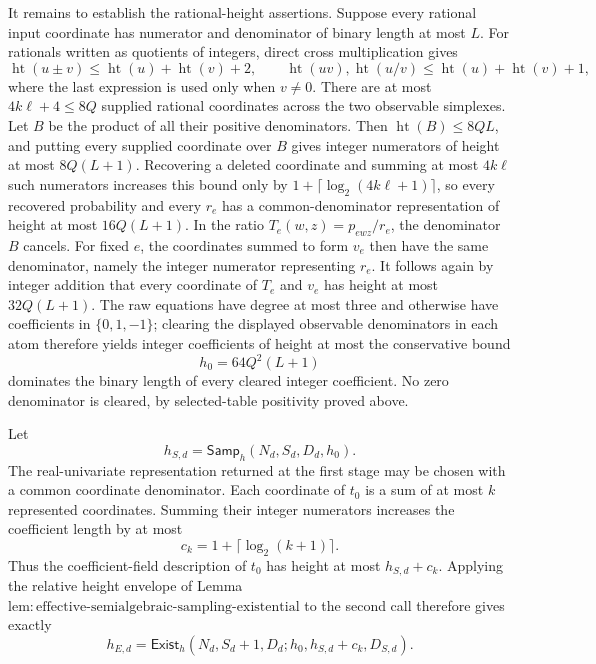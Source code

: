 It remains to establish the rational-height assertions.  Suppose every rational input coordinate has numerator and denominator of binary length at most \(L\).  For rationals written as quotients of integers, direct cross multiplication gives
\[
\operatorname{ht}(u\pm v)\le
\operatorname{ht}(u)+\operatorname{ht}(v)+2,
\qquad
\operatorname{ht}(uv),\operatorname{ht}(u/v)
\le\operatorname{ht}(u)+\operatorname{ht}(v)+1,           \tag{17}
\]
where the last expression is used only when \(v\ne0\).  There are at most \(4k\ell+4\le8Q\) supplied rational coordinates across the two observable simplexes.  Let \(B\) be the product of all their positive denominators.  Then \(\operatorname{ht}(B)\le8QL\), and putting every supplied coordinate over \(B\) gives integer numerators of height at most \(8Q(L+1)\).  Recovering a deleted coordinate and summing at most \(4k\ell\) such numerators increases this bound only by \(1+\lceil\log_2(4k\ell+1)\rceil\), so every recovered probability and every \(r_e\) has a common-denominator representation of height at most \(16Q(L+1)\).  In the ratio \(T_e(w,z)=p_{ewz}/r_e\), the denominator \(B\) cancels.  For fixed \(e\), the coordinates summed to form \(v_e\) then have the same denominator, namely the integer numerator representing \(r_e\).  It follows again by integer addition that every coordinate of \(T_e\) and \(v_e\) has height at most \(32Q(L+1)\).  The raw equations have degree at most three and otherwise have coefficients in \(\{0,1,-1\}\); clearing the displayed observable denominators in each atom therefore yields integer coefficients of height at most the conservative bound
\[
h_0=64Q^2(L+1)                                             \tag{18}
\]
dominates the binary length of every cleared integer coefficient.  No zero denominator is cleared, by selected-table positivity proved above.

Let
\[
h_{S,d}=\mathsf{Samp}_h(N_d,S_d,D_d,h_0).                  \tag{19}
\]
The real-univariate representation returned at the first stage may be chosen with a common coordinate denominator.  Each coordinate of \(t_0\) is a sum of at most \(k\) represented coordinates.  Summing their integer numerators increases the coefficient length by at most
\[
c_k=1+\lceil\log_2(k+1)\rceil.
\]
Thus the coefficient-field description of \(t_0\) has height at most \(h_{S,d}+c_k\).  Applying the relative height envelope of Lemma \(\mathrm{lem{:}effective\text{-}semialgebraic\text{-}sampling\text{-}existential}\) to the second call therefore gives exactly
\[
h_{E,d}=\mathsf{Exist}_h
 (N_d,S_d+1,D_d;h_0,h_{S,d}+c_k,D_{S,d}).                 \tag{20}
\]

